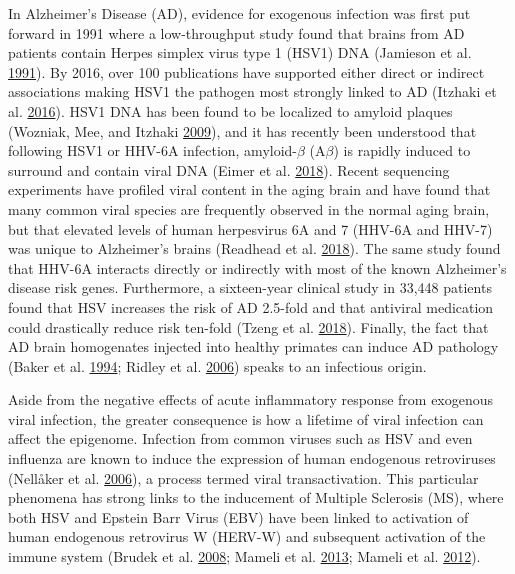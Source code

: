 \documentclass[onehalf,12pt]{beavtex}
\begin{document}
  In Alzheimer's Disease (AD), evidence for exogenous infection was first
  put forward in 1991 where a low-throughput study found that brains from
  AD patients contain Herpes simplex virus type 1 (HSV1) DNA (Jamieson et
  al. \protect\hyperlink{ref-JamiesonLatentherpessimplex1991}{1991}). By
  2016, over 100 publications have supported either direct or indirect
  associations making HSV1 the pathogen most strongly linked to AD
  (Itzhaki et al.
  \protect\hyperlink{ref-ItzhakiMicrobesAlzheimerDisease2016}{2016}). HSV1
  DNA has been found to be localized to amyloid plaques (Wozniak, Mee, and
  Itzhaki \protect\hyperlink{ref-WozniakHerpessimplexvirus2009}{2009}),
  and it has recently been understood that following HSV1 or HHV-6A
  infection, amyloid-\(\beta\) (A\(\beta\)) is rapidly induced to surround
  and contain viral DNA (Eimer et al.
  \protect\hyperlink{ref-EimerAlzheimerDiseaseAssociatedvAmyloid2018}{2018}).
  Recent sequencing experiments have profiled viral content in the aging
  brain and have found that many common viral species are frequently
  observed in the normal aging brain, but that elevated levels of human
  herpesvirus 6A and 7 (HHV-6A and HHV-7) was unique to Alzheimer's brains
  (Readhead et al.
  \protect\hyperlink{ref-ReadheadMultiscaleAnalysisIndependent2018}{2018}).
  The same study found that HHV-6A interacts directly or indirectly with
  most of the known Alzheimer's disease risk genes. Furthermore, a
  sixteen-year clinical study in 33,448 patients found that HSV increases
  the risk of AD 2.5-fold and that antiviral medication could drastically
  reduce risk ten-fold (Tzeng et al.
  \protect\hyperlink{ref-TzengAntiherpeticMedicationsReduced2018}{2018}).
  Finally, the fact that AD brain homogenates injected into healthy
  primates can induce AD pathology (Baker et al.
  \protect\hyperlink{ref-BakerInductionA4amyloid1994}{1994}; Ridley et al.
  \protect\hyperlink{ref-RidleyVerylongterm2006}{2006}) speaks to an
  infectious origin.
  
  Aside from the negative effects of acute inflammatory response from
  exogenous viral infection, the greater consequence is how a lifetime of
  viral infection can affect the epigenome. Infection from common viruses
  such as HSV and even influenza are known to induce the expression of
  human endogenous retroviruses (Nellåker et al.
  \protect\hyperlink{ref-NellakerTransactivationelementshuman2006}{2006}),
  a process termed viral transactivation. This particular phenomena has
  strong links to the inducement of Multiple Sclerosis (MS), where both
  HSV and Epstein Barr Virus (EBV) have been linked to activation of human
  endogenous retrovirus W (HERV-W) and subsequent activation of the immune
  system (Brudek et al.
  \protect\hyperlink{ref-BrudekSynergisticimmuneresponses2008}{2008};
  Mameli et al.
  \protect\hyperlink{ref-MameliActivationMSRVTypeEndogenous2013a}{2013};
  Mameli et al.
  \protect\hyperlink{ref-MameliExpressionactivationEpstein2012}{2012}).
  
\end{document}
